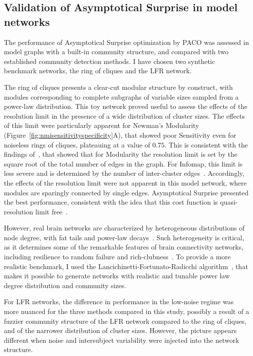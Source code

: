 \subsection{Validation of Asymptotical Surprise in model networks}
The performance of Asymptotical Surprise optimization by PACO was assessed in model graphs with a built-in community structure, and compared with two established community detection methods. I have chosen two synthetic benchmark networks, the ring of cliques and the LFR network.

The ring of cliques presents a clear-cut modular structure by construct, with modules corresponding to complete subgraphs of variable sizes sampled from a power-law distribution. 
This toy network proved useful to assess the effects of the resolution limit in the presence of a wide distribution of cluster sizes. The effects of this limit were particularly apparent for Newman's Modularity (Figure~\ref{fig:nmisensitivityspecificity}A), that showed poor Sensitivity even for noiseless rings of cliques, plateauing at a value of $0.75$.
This is consistent with the findings of~\cite{fortunato2007}, that showed that for Modularity the resolution limit is set by the square root of the total number of edges in the graph.
For Infomap, this limit is less severe and is determined by the number of inter-cluster edges~\cite{kawamoto2015}. Accordingly, the effects of the resolution limit were not apparent in this model network, where modules are sparingly connected by single edges.
Asymptotical Surprise presented the best performance, consistent with the idea that this cost function is quasi-resolution limit free~\cite{traag2015}.

However, real brain networks are characterized by heterogeneous distributions of node degree, with fat tails and power-law decays~\cite{bullmore2009}. Such heterogeneity is critical, as it determines some of the remarkable features of brain connectivity networks, including resilience to random failure and rich-clubness~\cite{vandenheuvel2011,vandenheuvel2013a}. To provide a more realistic benchmark, I used the Lancichinetti-Fortunato-Radicchi algorithm~\cite{lancichinetti2008}, that makes it possible to generate networks with realistic and tunable power law degree distribution and community sizes.

For LFR networks, the difference in performance in the low-noise regime was more nuanced for the three methods compared in this study, possibly a result of a fuzzier community structure of the LFR network compared to the ring of cliques, and of the narrower distribution of cluster sizes. However, the picture appears different when noise and intersubject variability were injected into the network structure.

